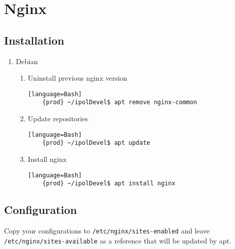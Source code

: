 \documentclass[a4paper,12pt]{article}
\begin{document}
\section{Nginx}

\subsection{Installation}

\begin{enumerate}
\item Debian

\begin{enumerate}
    \item Uninstall previous nginx version
    \begin{verbatim}[language=Bash]
	{prod} ~/ipolDevel$ apt remove nginx-common
    \end{verbatim}

    \item Update repositories
    \begin{verbatim}[language=Bash]
    {prod} ~/ipolDevel$ apt update
    \end{verbatim}

    \item Install nginx
    \begin{verbatim}[language=Bash]
    {prod} ~/ipolDevel$ apt install nginx
    \end{verbatim}
    \end{enumerate}    
\end{enumerate}

\subsection{Configuration}

Copy your configurations to {\tt /etc/nginx/sites-enabled} and leave {\tt /etc/nginx/sites-available} as a reference that will be updated by apt.
\end{document}
